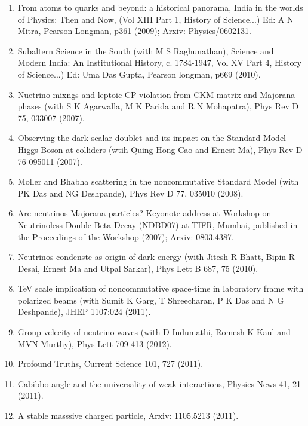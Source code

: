\begin{enumerate}
\item From atoms to quarks and beyond: a historical panorama, India in the worlds of Physics: Then and Now, (Vol XIII Part 1, History of Science...) Ed: A N Mitra, Pearson Longman, p361 (2009); Arxiv: Physics/0602131.

\item Subaltern Science in the South (with M S Raghunathan), Science and Modern India: An Institutional History, c. 1784-1947, Vol XV Part 4, History of Science...) Ed: Uma Das Gupta, Pearson longman, p669 (2010).

\item Nuetrino mixngs and leptoic CP violation from CKM matrix and Majorana phases (with S K Agarwalla, M K Parida and R N Mohapatra), Phys Rev D 75, 033007 (2007).

\item Observing the dark scalar doublet and its impact on the Standard Model Higgs Boson at colliders (wtih Quing-Hong Cao and Ernest Ma), Phys Rev D 76 095011 (2007).

\item Moller and Bhabha scattering in the noncommutative Standard Model (with PK Das and NG Deshpande), Phys Rev D 77, 035010 (2008).

\item Are neutrinos Majorana particles? Keyonote address at Workshop on Neutrinoless Double Beta Decay (NDBD07) at TIFR, Mumbai, published in the Proceedings of the Workshop (2007); Arxiv: 0803.4387.

\item Neutrinos condenste as origin of dark energy (with Jitesh R Bhatt, Bipin R Desai, Ernest Ma and Utpal Sarkar), Phys Lett B 687, 75 (2010).

\item TeV scale implication of noncommutative space-time in laboratory frame with polarized beams (with Sumit K Garg, T Shreecharan, P K Das and N G Deshpande), JHEP 1107:024 (2011).

\item Group velecity of neutrino waves (with D Indumathi, Ro\-mesh K Kaul and MVN Murthy), Phys Lett 709 413 (2012).

\item Profound Truths, Current Science 101, 727 (2011).

\item Cabibbo angle and the universality of weak interactions, Physics News 41, 21 (2011).

\item A stable masssive charged particle, Arxiv: 1105.5213 (2011).


\end{enumerate}
